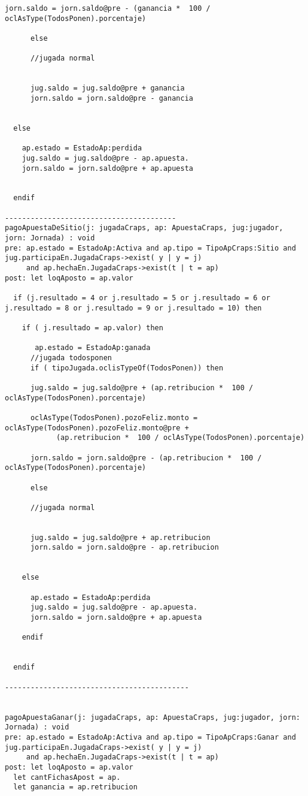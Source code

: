 \begin{framed}
\begin{lstlisting}[breaklines=true]
      jorn.saldo = jorn.saldo@pre - (ganancia *  100 / oclAsType(TodosPonen).porcentaje)

      else

      //jugada normal


      jug.saldo = jug.saldo@pre + ganancia
      jorn.saldo = jorn.saldo@pre - ganancia  


  else 
    
    ap.estado = EstadoAp:perdida
    jug.saldo = jug.saldo@pre - ap.apuesta.
    jorn.saldo = jorn.saldo@pre + ap.apuesta
    
  
  endif

----------------------------------------
pagoApuestaDeSitio(j: jugadaCraps, ap: ApuestaCraps, jug:jugador, jorn: Jornada) : void
pre: ap.estado = EstadoAp:Activa and ap.tipo = TipoApCraps:Sitio and jug.participaEn.JugadaCraps->exist( y | y = j) 
     and ap.hechaEn.JugadaCraps->exist(t | t = ap)
post: let loqAposto = ap.valor

  if (j.resultado = 4 or j.resultado = 5 or j.resultado = 6 or j.resultado = 8 or j.resultado = 9 or j.resultado = 10) then

    if ( j.resultado = ap.valor) then
      
       ap.estado = EstadoAp:ganada
      //jugada todosponen
      if ( tipoJugada.oclisTypeOf(TodosPonen)) then 
    
      jug.saldo = jug.saldo@pre + (ap.retribucion *  100 / oclAsType(TodosPonen).porcentaje)
    
      oclAsType(TodosPonen).pozoFeliz.monto = oclAsType(TodosPonen).pozoFeliz.monto@pre + 
            (ap.retribucion *  100 / oclAsType(TodosPonen).porcentaje)

      jorn.saldo = jorn.saldo@pre - (ap.retribucion *  100 / oclAsType(TodosPonen).porcentaje)

      else

      //jugada normal


      jug.saldo = jug.saldo@pre + ap.retribucion
      jorn.saldo = jorn.saldo@pre - ap.retribucion

 
    else
      
      ap.estado = EstadoAp:perdida
      jug.saldo = jug.saldo@pre - ap.apuesta.
      jorn.saldo = jorn.saldo@pre + ap.apuesta

    endif


  endif

-------------------------------------------


pagoApuestaGanar(j: jugadaCraps, ap: ApuestaCraps, jug:jugador, jorn: Jornada) : void
pre: ap.estado = EstadoAp:Activa and ap.tipo = TipoApCraps:Ganar and jug.participaEn.JugadaCraps->exist( y | y = j) 
     and ap.hechaEn.JugadaCraps->exist(t | t = ap)
post: let loqAposto = ap.valor
  let cantFichasApost = ap.
  let ganancia = ap.retribucion


\end{lstlisting}
\end{framed}
